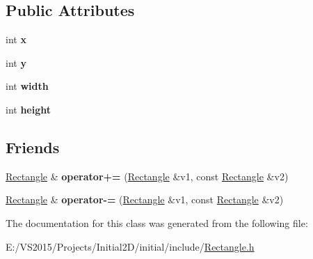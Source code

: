 \subsection*{Public Attributes}
\begin{DoxyCompactItemize}
\item 
\mbox{\label{class_r_s_1_1_rectangle_a46f1a9d01060d355a3738ad5a97201d7}} 
int {\bfseries x}
\item 
\mbox{\label{class_r_s_1_1_rectangle_af3c48c5038db269390f79db5a65bae18}} 
int {\bfseries y}
\item 
\mbox{\label{class_r_s_1_1_rectangle_a955c0bcbd18aadf866a3f6fab2f9dce6}} 
int {\bfseries width}
\item 
\mbox{\label{class_r_s_1_1_rectangle_a65640c14c8cf8431f06bdc843e76ef63}} 
int {\bfseries height}
\end{DoxyCompactItemize}
\subsection*{Friends}
\begin{DoxyCompactItemize}
\item 
\mbox{\label{class_r_s_1_1_rectangle_aac67d6d33f5678ecca9aec69b2e336e4}} 
\mbox{\hyperlink{class_r_s_1_1_rectangle}{Rectangle}} \& {\bfseries operator+=} (\mbox{\hyperlink{class_r_s_1_1_rectangle}{Rectangle}} \&v1, const \mbox{\hyperlink{class_r_s_1_1_rectangle}{Rectangle}} \&v2)
\item 
\mbox{\label{class_r_s_1_1_rectangle_af54d1b2575124541db9a5575785839e8}} 
\mbox{\hyperlink{class_r_s_1_1_rectangle}{Rectangle}} \& {\bfseries operator-\/=} (\mbox{\hyperlink{class_r_s_1_1_rectangle}{Rectangle}} \&v1, const \mbox{\hyperlink{class_r_s_1_1_rectangle}{Rectangle}} \&v2)
\end{DoxyCompactItemize}


The documentation for this class was generated from the following file\+:\begin{DoxyCompactItemize}
\item 
E\+:/\+V\+S2015/\+Projects/\+Initial2\+D/initial/include/\mbox{\hyperlink{_rectangle_8h}{Rectangle.\+h}}\end{DoxyCompactItemize}
